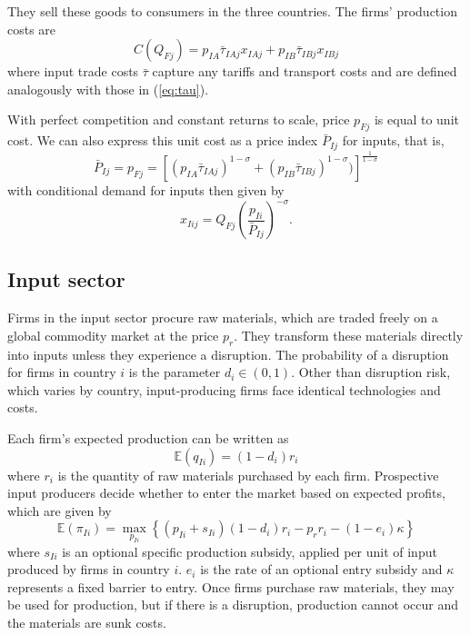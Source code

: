 \documentclass{article}
\begin{document}
They sell these goods to consumers in the three countries. The firms' production costs are
\begin{equation}
    C(Q_{Fj}) = p_{IA} \bar{\tau}_{IAj} x_{IAj} + p_{IB} \bar{\tau}_{IBj} x_{IBj}
\end{equation}
where input trade costs $\bar{\tau}$ capture any tariffs and transport costs and are defined analogously with those in (\ref{eq:tau}).

With perfect competition and constant returns to scale, price $p_{Fj}$ is equal to unit cost. We can also express this unit cost as a price index $\bar{P}_{Ij}$ for inputs, that is,
\begin{equation}
    \bar{P}_{Ij} = p_{Fj} = \left[ ( p_{IA} \bar{\tau}_{IAj} )^{1 - \sigma} + ( p_{IB} \bar{\tau}_{IBj} )^{1 - \sigma}) \right]^{\frac{1}{1 - \sigma}}
\end{equation}
with conditional demand for inputs then given by
\begin{equation} \label{eq:input_demand}
    x_{Iij} = Q_{Fj} \left( \frac{p_{Ii}}{\bar{P}_{Ij}} \right)^{-\sigma}.
\end{equation}

\subsection{Input sector}

Firms in the input sector procure raw materials, which are traded freely on a global commodity market at the price $p_r$. They transform these materials directly into inputs unless they experience a disruption. The probability of a disruption for firms in country $i$ is the parameter $d_i \in (0, 1)$. Other than disruption risk, which varies by country, input-producing firms face identical technologies and costs.

Each firm's expected production can be written as
\begin{equation}
    \mathbb{E} (q_{Ii}) = (1 - d_i) r_i
\end{equation}
where $r_i$ is the quantity of raw materials purchased by each firm. Prospective input producers decide whether to enter the market based on expected profits, which are given by
\begin{equation} \label{eq:input_profit}
    \mathbb{E} (\pi_{Ii}) = \max_{p_{Ii}} \left\{ (p_{Ii} + s_{Ii}) (1 - d_i) r_{i} - p_r r_i - (1 - e_i) \kappa \right\}
\end{equation}
where $s_{Ii}$ is an optional specific production subsidy, applied per unit of input produced by firms in country $i$. $e_i$ is the rate of an optional entry subsidy and $\kappa$ represents a fixed barrier to entry. Once firms purchase raw materials, they may be used for production, but if there is a disruption, production cannot occur and the materials are sunk costs.
\end{document}
